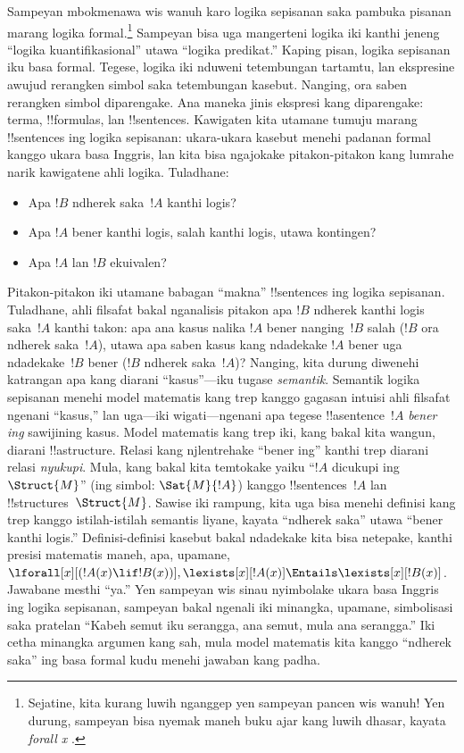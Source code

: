 \documentclass[../../../include/open-logic-section]{subfiles}
\begin{document}


Sampeyan mbokmenawa wis wanuh karo logika sepisanan saka pambuka
pisanan marang logika formal.\footnote{Sejatine, kita kurang luwih
nganggep yen sampeyan pancen wis wanuh!{} Yen durung, sampeyan bisa
nyemak maneh buku ajar kang luwih dhasar, kayata \emph{forall x}
\citep{Magnus2021}.} Sampeyan bisa uga mangerteni logika iki kanthi
jeneng ``logika kuantifikasional'' utawa ``logika predikat.'' Kaping
pisan, logika sepisanan iku basa formal. Tegese, logika iki nduweni
tetembungan tartamtu, lan ekspresine awujud rerangken simbol saka
tetembungan kasebut. Nanging, ora saben rerangken simbol diparengake.
Ana maneka jinis ekspresi kang diparengake: terma, !!{formula}s, lan
!!{sentence}s. Kawigaten kita utamane tumuju marang !!{sentence}s ing
logika sepisanan: ukara-ukara kasebut menehi padanan formal kanggo
ukara basa Inggris, lan kita bisa ngajokake pitakon-pitakon kang
lumrahe narik kawigatene ahli logika. Tuladhane:
\begin{itemize}
    \item Apa $!B$ ndherek saka~$!A$ kanthi logis?
    \item Apa $!A$ bener kanthi logis, salah kanthi logis, utawa
kontingen?
    \item Apa $!A$ lan $!B$ ekuivalen?
\end{itemize}

Pitakon-pitakon iki utamane babagan ``makna'' !!{sentence}s ing logika
sepisanan. Tuladhane, ahli filsafat bakal nganalisis pitakon apa $!B$
ndherek kanthi logis saka~$!A$ kanthi takon: apa ana kasus nalika $!A$
bener nanging~$!B$ salah ($!B$ ora ndherek saka~$!A$), utawa apa saben
kasus kang ndadekake $!A$ bener uga ndadekake~$!B$ bener ($!B$ ndherek
saka~$!A$)? Nanging, kita durung diwenehi katrangan apa kang diarani
``kasus''---iku tugase \emph{semantik}. Semantik logika sepisanan
menehi model matematis kang trep kanggo gagasan intuisi ahli filsafat
ngenani ``kasus,'' lan uga---iki wigati---ngenani apa tegese
!!a{sentence}~$!A$ \emph{bener ing} sawijining kasus. Model matematis
kang trep iki, kang bakal kita wangun, diarani !!a{structure}. Relasi
kang njlentrehake ``bener ing'' kanthi trep diarani relasi
\emph{nyukupi}. Mula, kang bakal kita temtokake yaiku ``$!A$
dicukupi ing~$\Struct{M}$'' (ing simbol: $\Sat{M}{!A}$) kanggo
!!{sentence}s~$!A$ lan !!{structure}s~$\Struct{M}$. Sawise iki rampung,
kita uga bisa menehi definisi kang trep kanggo istilah-istilah semantis
liyane, kayata ``ndherek saka'' utawa ``bener kanthi logis.''
Definisi-definisi kasebut bakal ndadekake kita bisa netepake, kanthi
presisi matematis maneh, apa, upamane,
$\lforall[x][(!A(x) \lif !B(x))],
\lexists[x][!A(x)] \Entails \lexists[x][!B(x)]$.
Jawabane mesthi ``ya.'' Yen sampeyan wis sinau nyimbolake ukara basa
Inggris ing logika sepisanan, sampeyan bakal ngenali iki minangka,
upamane, simbolisasi saka pratelan ``Kabeh semut iku serangga, ana
semut, mula ana serangga.'' Iki cetha minangka argumen kang sah,
mula model matematis kita kanggo ``ndherek saka'' ing basa formal kudu
menehi jawaban kang padha.
\end{document}
